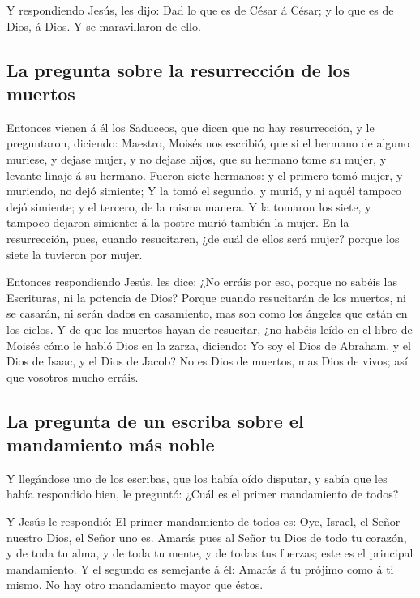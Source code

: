  Y respondiendo Jesús, les dijo: Dad lo que es de César á
César; y lo que es de Dios, á Dios. Y se maravillaron de ello.

\hypertarget{la-pregunta-sobre-la-resurrecciuxf3n-de-los-muertos}{%
\subsection{La pregunta sobre la resurrección de los
muertos}\label{la-pregunta-sobre-la-resurrecciuxf3n-de-los-muertos}}

 Entonces vienen á él los Saduceos, que dicen que no hay
resurrección, y le preguntaron, diciendo:  Maestro,
Moisés nos escribió, que si el hermano de alguno muriese, y dejase
mujer, y no dejase hijos, que su hermano tome su mujer, y levante linaje
á su hermano.  Fueron siete hermanos: y el primero tomó
mujer, y muriendo, no dejó simiente;  Y la tomó el
segundo, y murió, y ni aquél tampoco dejó simiente; y el tercero, de la
misma manera.  Y la tomaron los siete, y tampoco dejaron
simiente: á la postre murió también la mujer.  En la
resurrección, pues, cuando resucitaren, ¿de cuál de ellos será mujer?
porque los siete la tuvieron por mujer.

 Entonces respondiendo Jesús, les dice: ¿No erráis por
eso, porque no sabéis las Escrituras, ni la potencia de Dios?
 Porque cuando resucitarán de los muertos, ni se casarán,
ni serán dados en casamiento, mas son como los ángeles que están en los
cielos.  Y de que los muertos hayan de resucitar, ¿no
habéis leído en el libro de Moisés cómo le habló Dios en la zarza,
diciendo: Yo soy el Dios de Abraham, y el Dios de Isaac, y el Dios de
Jacob?  No es Dios de muertos, mas Dios de vivos; así que
vosotros mucho erráis.

\hypertarget{la-pregunta-de-un-escriba-sobre-el-mandamiento-muxe1s-noble}{%
\subsection{La pregunta de un escriba sobre el mandamiento más
noble}\label{la-pregunta-de-un-escriba-sobre-el-mandamiento-muxe1s-noble}}

 Y llegándose uno de los escribas, que los había oído
disputar, y sabía que les había respondido bien, le preguntó: ¿Cuál es
el primer mandamiento de todos?

 Y Jesús le respondió: El primer mandamiento de todos es:
Oye, Israel, el Señor nuestro Dios, el Señor uno es. 
Amarás pues al Señor tu Dios de todo tu corazón, y de toda tu alma, y de
toda tu mente, y de todas tus fuerzas; este es el principal mandamiento.
 Y el segundo es semejante á él: Amarás á tu prójimo como
á ti mismo. No hay otro mandamiento mayor que éstos.

